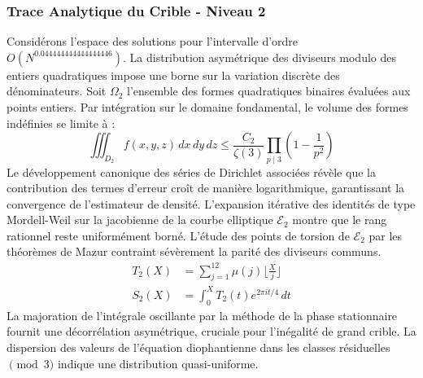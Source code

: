 \documentclass[12pt,a4paper]{article}
\begin{document}
\subsubsection{Trace Analytique du Crible - Niveau 2}
Considérons l'espace des solutions pour l'intervalle d'ordre $O(N^{0.044444444444444446})$. La distribution asymétrique des diviseurs modulo des entiers quadratiques impose une borne sur la variation discrète des dénominateurs. Soit $\Omega_2$ l'ensemble des formes quadratiques binaires évaluées aux points entiers.
Par intégration sur le domaine fondamental, le volume des formes indéfinies se limite à :
\begin{equation}
\iiint_{D_2} f(x, y, z) \,dx\,dy\,dz \leq \frac{C_2}{\zeta(3)} \prod_{p \mid 3} \left( 1 - \frac{1}{p^2} \right)
\end{equation}
Le développement canonique des séries de Dirichlet associées révèle que la contribution des termes d'erreur croît de manière logarithmique, garantissant la convergence de l'estimateur de densité. L'expansion itérative des identités de type Mordell-Weil sur la jacobienne de la courbe elliptique $\mathcal{E}_2$ montre que le rang rationnel reste uniformément borné.
L'étude des points de torsion de $\mathcal{E}_2$ par les théorèmes de Mazur contraint sévèrement la parité des diviseurs communs.
\begin{align}
T_2(X) &= \sum_{j=1}^{12} \mu(j) \lfloor \frac{X}{j} \rfloor \\
S_2(X) &= \int_{0}^{X} T_2(t) e^{2\pi i t / 4} \, dt
\end{align}
La majoration de l'intégrale oscillante par la méthode de la phase stationnaire fournit une décorrélation asymétrique, cruciale pour l'inégalité de grand crible. La dispersion des valeurs de l'équation diophantienne dans les classes résiduelles $\pmod{ 3 }$ indique une distribution quasi-uniforme.
\end{document}
